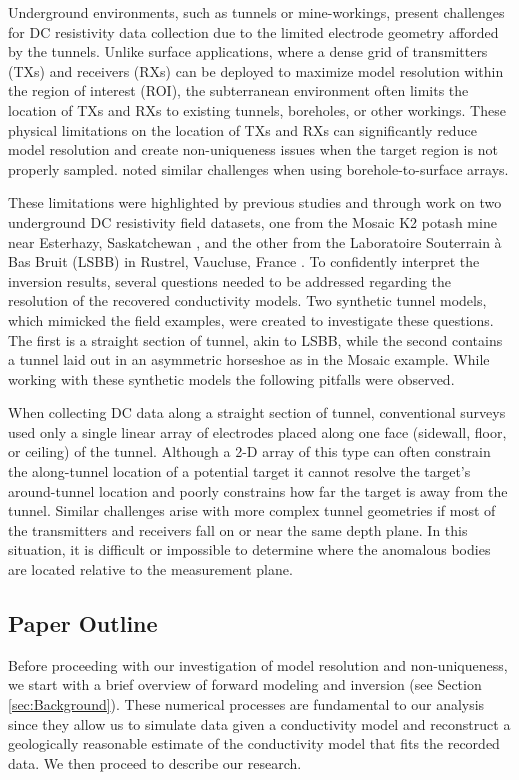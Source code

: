 \documentclass[preprint,authoryear,12pt]{elsarticle}
\begin{document}
Underground environments, such as tunnels or mine-workings, present challenges for DC resistivity data collection due to the limited electrode geometry afforded by the tunnels. Unlike surface applications, where a dense grid of transmitters (TXs) and receivers (RXs) can be deployed to maximize model resolution within the region of interest (ROI), the subterranean environment often limits the location of TXs and RXs to existing tunnels, boreholes, or other workings. These physical limitations on the location of TXs and RXs can significantly reduce model resolution and create non-uniqueness issues when the target region is not properly sampled. \citet{Tsourlos2011} noted similar challenges when using borehole-to-surface arrays.

These limitations were highlighted by previous studies and through work on two underground DC resistivity field datasets, one from the Mosaic K2 potash mine near Esterhazy, Saskatchewan \citep{Mitchell2016a,Mitchell2016}, and the other from the Laboratoire Souterrain \`a Bas Bruit (LSBB) in Rustrel, Vaucluse, France \citep{Maxwell2010}. To confidently interpret the inversion results, several questions needed to be addressed regarding the resolution of the recovered conductivity models. Two synthetic tunnel models, which mimicked the field examples, were created to investigate these questions. The first is a straight section of tunnel, akin to LSBB, while the second contains a tunnel laid out in an asymmetric horseshoe as in the Mosaic example. While working with these synthetic models the following pitfalls were observed.

When collecting DC data along a straight section of tunnel, conventional surveys used only a single linear array of electrodes placed along one face (sidewall, floor, or ceiling) of the tunnel. Although a 2-D array of this type can often constrain the along-tunnel location of a potential target it cannot resolve the target’s around-tunnel location and poorly constrains how far the target is away from the tunnel. Similar challenges arise with more complex tunnel geometries if most of the transmitters and receivers fall on or near the same depth plane. In this situation, it is difficult or impossible to determine where the anomalous bodies are located relative to the measurement plane.


\subsection{Paper Outline}
Before proceeding with our investigation of model resolution and non-uniqueness, we start with a brief overview of forward modeling and inversion (see Section \ref{sec:Background}). These numerical processes are fundamental to our analysis since they allow us to simulate data given a conductivity model and reconstruct a geologically reasonable estimate of the conductivity model that fits the recorded data. We then proceed to describe our research.
\end{document}
